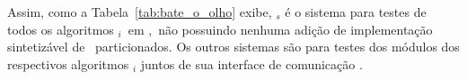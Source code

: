         Assim, como a Tabela~\ref{tab:bate_o_olho} exibe, \Ss$_s$ é o sistema para testes de todos os algoritmos \A$_{i}$\ em \softwares,\ não possuindo nenhuma adição de implementação sintetizável de \hardwares\ particionados.
        Os outros sistemas são para testes dos módulos dos respectivos algoritmos \A$ _i $ juntos de sua interface de comunicação \hs.
        
        
